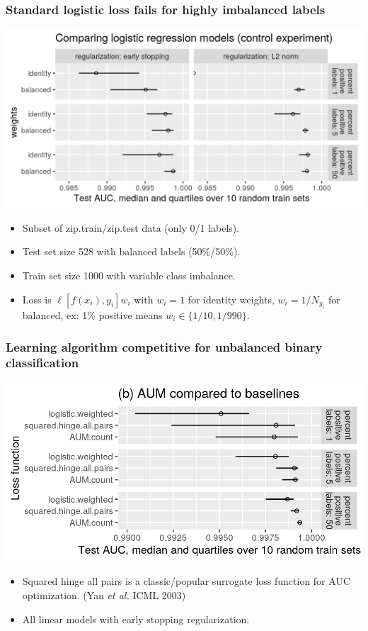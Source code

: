 \documentclass{beamer}
\begin{document}
\begin{frame}
  \frametitle{Standard logistic loss fails for highly imbalanced labels}

 \includegraphics[width=\textwidth]{figure-unbalanced-grad-desc-logistic.png}

 \begin{itemize}
 \item Subset of zip.train/zip.test data (only 0/1 labels).
 \item Test set size 528 with balanced labels (50\%/50\%).
 \item Train set size 1000 with variable class imbalance.
 \item Loss is $\ell[f(x_i), y_i]w_i$ with $w_i=1$ for identity
   weights, $w_i=1/N_{y_i}$ for balanced, ex: 1\% positive means
   $w_i\in\{1/10,1/990\}$.
 \end{itemize}

\end{frame}

\begin{frame}
  \frametitle{Learning algorithm competitive for unbalanced binary classification}

 \includegraphics[width=\textwidth]{figure-unbalanced-grad-desc.png}

 \begin{itemize}
 \item Squared hinge all pairs is a classic/popular surrogate loss function
   for AUC optimization. (Yan \emph{et al.} ICML 2003)
 \item All linear models with early stopping regularization.
 \end{itemize}

\end{frame}
\end{document}
